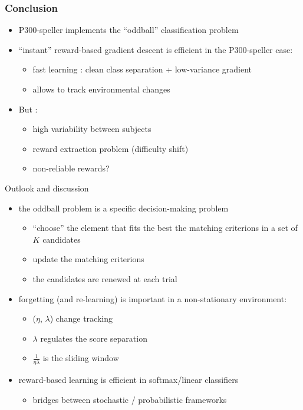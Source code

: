 \documentclass{beamer}
\begin{document}
\begin{frame}\frametitle{Conclusion}
 \begin{itemize}
  \item P300-speller implements the ``oddball'' classification problem 
  \item ``instant'' reward-based gradient descent is efficient in the P300-speller case:
    \begin{itemize}
      \item fast learning : clean class separation + low-variance gradient
      \item allows to track environmental changes
    \end{itemize}
    \item But :
    \begin{itemize}
      \item high variability between subjects
      \item reward extraction problem (difficulty shift)
      \item non-reliable rewards?
    \end{itemize}
 \end{itemize}
\end{frame}

\begin{frame}{Outlook and discussion}
 \begin{itemize}
  \item the oddball problem is a specific decision-making problem
  \begin{itemize}
    \item ``choose'' the element that fits the best the matching criterions in a set of $K$ candidates
    \item update the matching criterions
    \item the candidates are renewed at each trial
  \end{itemize}
  \item forgetting (and re-learning) is important in a non-stationary environment:
  \begin{itemize}
    \item ($\eta$, $\lambda$) change tracking 
    \item $\lambda$ regulates the score separation
    \item $ \frac{1}{\eta\lambda}$ is the sliding window 
  \end{itemize}
  \item reward-based learning is efficient in softmax/linear classifiers
  \begin{itemize}
  \item bridges between stochastic / probabilistic frameworks
  \end{itemize}
 \end{itemize}

\end{frame}





\end{document}
